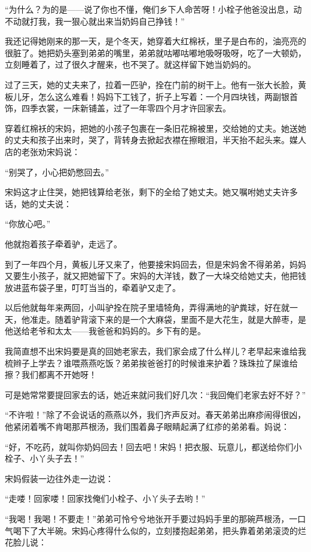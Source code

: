 \par “为什么？为的是——说了你也不懂，俺们乡下人命苦呀！小栓子他爸没出息，动不动就打我，我一狠心就出来当奶妈自己挣钱！”
\par 我还记得她刚来的那一天，是个冬天，她穿着大红棉袄，里子是白布的，油亮亮的很脏了。她把奶头塞到弟弟的嘴里，弟弟就咕嘟咕嘟地吸呀吸呀，吃了一大顿奶，立刻睡着了，过了很久才醒来，也不哭了。就这样留下她当奶妈的。
\par 过了三天，她的丈夫来了，拉着一匹驴，拴在门前的树干上。他有一张大长脸，黄板儿牙，怎么这么难看！妈妈下工钱了，折子上写着：一个月四块钱，两副银首饰，四季衣裳，一床新铺盖，过了一年零四个月才许回家去。
\par 穿着红棉袄的宋妈，把她的小孩子包裹在一条旧花棉被里，交给她的丈夫。她送她的丈夫和孩子出来时，哭了，背转身去掀起衣襟在擦眼泪，半天抬不起头来。媒人店的老张劝宋妈说：
\par “别哭了，小心把奶憋回去。”
\par 宋妈这才止住哭，她把钱算给老张，剩下的全给了她丈夫。她又嘱咐她丈夫许多话，她的丈夫说：
\par “你放心吧。”
\par 他就抱着孩子牵着驴，走远了。
\par 到了一年四个月，黄板儿牙又来了，他要接宋妈回去，但是宋妈舍不得弟弟，妈妈又要生小孩子，就又把她留下了。宋妈的大洋钱，数了一大垛交给她丈夫，他把钱放进蓝布袋子里，叮叮当当的，牵着驴又走了。
\par 以后他就每年来两回，小叫驴拴在院子里墙犄角，弄得满地的驴粪球，好在就一天，他准走。随着驴背滚下来的是一个大麻袋，里面不是大花生，就是大醉枣，是他送给老爷和太太——我爸爸和妈妈的。乡下有的是。
\par 我简直想不出宋妈要是真的回她老家去，我们家会成了什么样儿？老早起来谁给我梳辫子上学去？谁喂燕燕吃饭？弟弟挨爸爸打的时候谁来护着？珠珠拉了屎谁给擦？我们都离不开她呀！
\par 可是她常常要提回家去的话，她近来就问我们好几次：“我回俺们老家去好不好？”
\par “不许啦！”除了不会说话的燕燕以外，我们齐声反对。春天弟弟出麻疹闹得很凶，他紧闭着嘴不肯喝那芦根汤，我们围着鼻子眼睛起满了红疹的弟弟看。妈说：
\par “好，不吃药，就叫你奶妈回去！回去吧！宋妈！把衣服、玩意儿，都送给你们小栓子、小丫头子去！”
\par 宋妈假装一边往外走一边说：
\par “走喽！回家喽！回家找俺们小栓子、小丫头子去哟！”
\par “我喝！我喝！不要走！”弟弟可怜兮兮地张开手要过妈妈手里的那碗芦根汤，一口气喝下了大半碗。宋妈心疼得什么似的，立刻搂抱起弟弟，把头靠着弟弟滚烫的烂花脸儿说：
